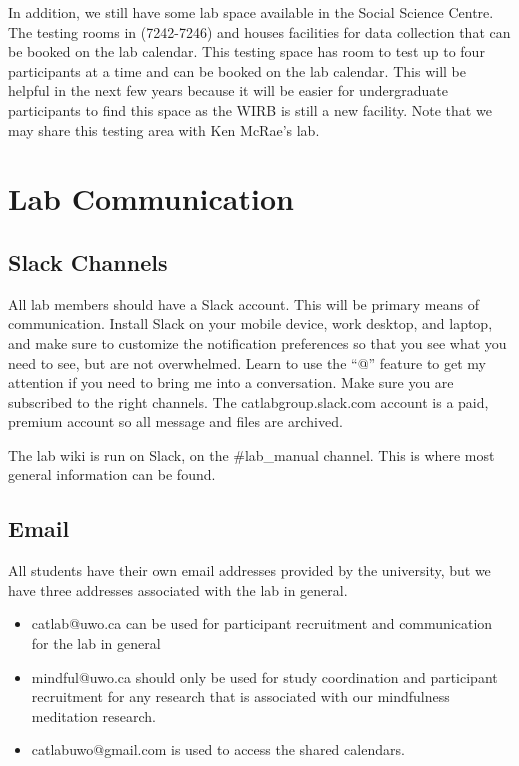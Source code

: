\documentclass{article}
\begin{document}
In addition, we still have some lab space available in the Social Science Centre. The testing rooms in (7242-7246) and houses facilities for data collection that can be booked on the lab calendar. This testing space has room to test up to four participants at a time and can be booked on the lab calendar. This will be helpful in the next few years because it will be easier for undergraduate participants to find this space as the WIRB is still a new facility. Note that we may share this testing area with Ken McRae's lab. 

\section{Lab Communication}

\subsection{Slack Channels}
All lab members should have a Slack account. This will be primary means of communication. Install Slack on your mobile device, work desktop, and laptop, and make sure to customize the notification preferences so that you see what you need to see, but are not overwhelmed. Learn to use the ``@'' feature to get my attention if you need to bring me into a conversation. Make sure you are subscribed to the right channels. The catlabgroup.slack.com account is a paid, premium account so all message and files are archived. 

The lab wiki is run on Slack, on the \#lab\_manual channel. This is where most general information can be found. 

\subsection{Email}
All students have their own email addresses provided by the university, but we have three addresses associated with the lab in general. 
\begin{itemize}
\item catlab@uwo.ca can be used for participant recruitment and communication for the lab in general 
\item mindful@uwo.ca should only be used for study coordination and participant recruitment for any research that is associated with our mindfulness meditation research.
\item catlabuwo@gmail.com is used to access the shared calendars.
\end{itemize}
\end{document}
